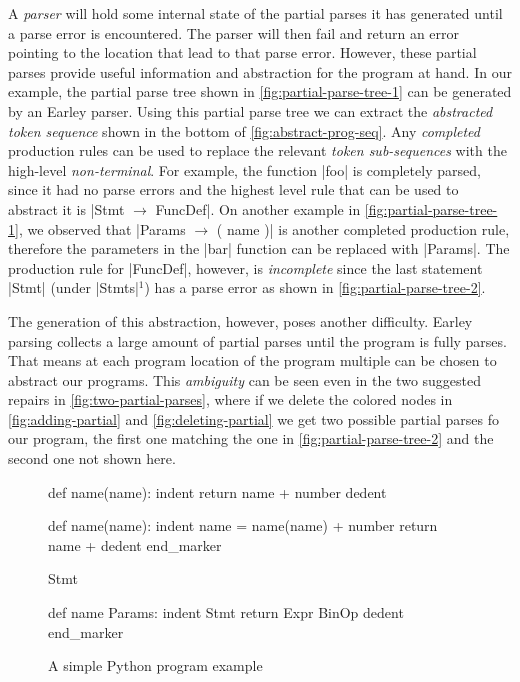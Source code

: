  A \emph{parser} will hold some
internal state of the partial parses it has generated until a parse error is
encountered. The parser will then fail and return an error pointing to the
location that lead to that parse error. However, these partial parses provide
useful information and abstraction for the program at hand. In our example, the
partial parse tree shown in \autoref{fig:partial-parse-tree-1} can be generated
by an Earley parser. Using this partial parse tree we can extract the
\emph{abstracted token sequence} shown in the bottom of
\autoref{fig:abstract-prog-seq}. Any \emph{completed} production rules can be
used to replace the relevant \emph{token sub-sequences} with the high-level
\emph{non-terminal}. For example, the function |foo| is completely parsed, since
it had no parse errors and the highest level rule that can be used to abstract
it is |Stmt $\rightarrow$ FuncDef|. On another example in
\autoref{fig:partial-parse-tree-1}, we observed that
%
|Params $\rightarrow$ ( name )| is another completed production rule, therefore
the parameters in the |bar| function can be replaced with |Params|. The
production rule for |FuncDef|, however, is \emph{incomplete} since the last
statement |Stmt| (under |Stmts|$^1$) has a parse error as shown in
\autoref{fig:partial-parse-tree-2}.

The generation of this abstraction, however, poses another difficulty. Earley
parsing collects a large amount of partial parses until the program is fully
parses. That means at each program location of the program multiple can be
chosen to abstract our programs. This \emph{ambiguity} can be seen even in the
two suggested repairs in \autoref{fig:two-partial-parses}, where if we delete
the colored nodes in \autoref{fig:adding-partial} and
\autoref{fig:deleting-partial} we get two possible partial parses fo our
program, the first one matching the one in \autoref{fig:partial-parse-tree-2}
and the second one not shown here.


\begin{figure}[t]
\centering
\begin{minipage}[c]{0.56\linewidth}
\begin{ecode}
def name(name): \n
indent return name + number \n
dedent \n

def name(name): \n
indent name = name(name) + number \n
return name + \n
dedent end_marker
\end{ecode}
\label{fig:prog-seq}
\end{minipage}%
\hspace{0.02\linewidth}%
\begin{minipage}[c]{0.42\linewidth}
\begin{ecode}
Stmt \n

def name Params: \n
indent Stmt \n
return Expr BinOp \n
dedent end_marker
\end{ecode}
\label{fig:abstract-prog-seq}
\end{minipage}
\caption{A simple Python program example}
\end{figure}

